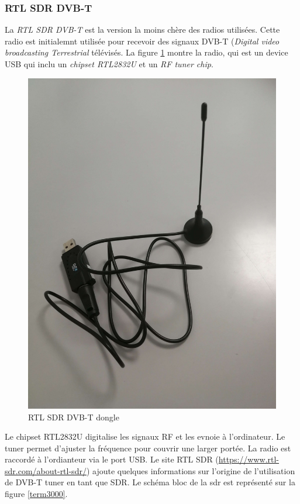 \newpage

\subsubsection{RTL SDR DVB-T}\label{dvbt}

La \textit{RTL SDR DVB-T} est la version la moins chère des radios utilisées. Cette radio est initialemnt utilisée pour recevoir des signaux DVB-T (\textit{Digital video broadcasting Terrestrial} télévisés. La figure \ref{term31} montre la radio, qui est un device USB qui inclu un \textit{chipset RTL2832U} et un \textit{RF tuner chip}.

\begin{figure}[h]
\centering

\includegraphics[scale=0.08]{images/dvbt.png}
\caption{RTL SDR DVB-T dongle}\label{term31}
\end{figure}

Le chipset RTL2832U digitalise les signaux RF et les evnoie à l'ordinateur. Le tuner permet d'ajuster la fréquence pour couvrir une larger portée.
La radio est raccordé à l'ordianteur via le port USB. Le site RTL SDR (\href{https://www.rtl-sdr.com/about-rtl-sdr/}{https://www.rtl-sdr.com/about-rtl-sdr/}) ajoute quelques informations sur l'origine de l'utilisation de DVB-T tuner en tant que SDR. Le schéma bloc de la sdr est représenté sur la figure \ref{term3000}. 

